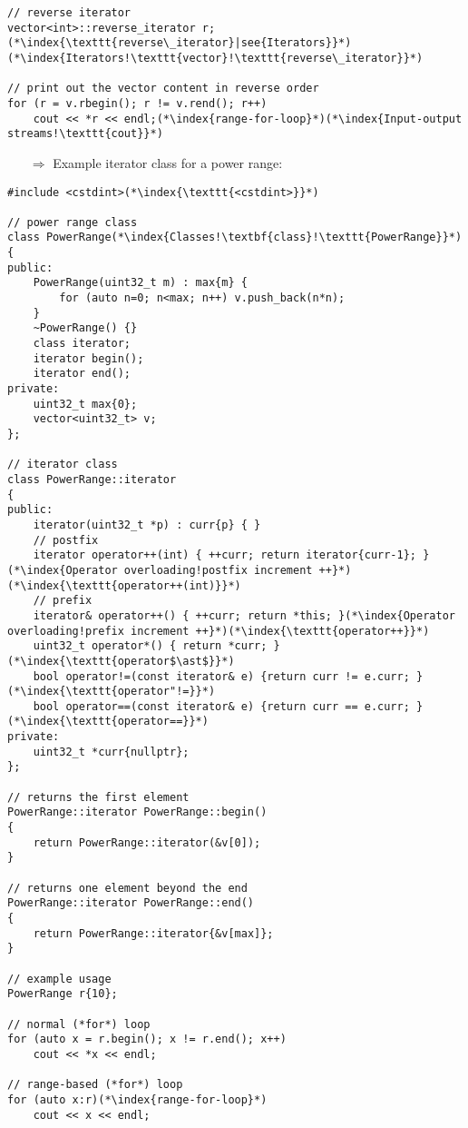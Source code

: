 \documentclass[10pt]{article}
\begin{document}
\begin{lstlisting}
// reverse iterator
vector<int>::reverse_iterator r;(*\index{\texttt{reverse\_iterator}|see{Iterators}}*)(*\index{Iterators!\texttt{vector}!\texttt{reverse\_iterator}}*)

// print out the vector content in reverse order
for (r = v.rbegin(); r != v.rend(); r++)
    cout << *r << endl;(*\index{range-for-loop}*)(*\index{Input-output streams!\texttt{cout}}*)
\end{lstlisting}
\begin{enumerate}
\item[$\Rightarrow$] Example iterator class for a power range:
\end{enumerate}
\begin{lstlisting}
#include <cstdint>(*\index{\texttt{<cstdint>}}*)

// power range class
class PowerRange(*\index{Classes!\textbf{class}!\texttt{PowerRange}}*)
{
public:
    PowerRange(uint32_t m) : max{m} {
        for (auto n=0; n<max; n++) v.push_back(n*n);
    }
    ~PowerRange() {}
    class iterator;
    iterator begin();
    iterator end();
private:
    uint32_t max{0};
    vector<uint32_t> v;
};

// iterator class
class PowerRange::iterator
{
public:
    iterator(uint32_t *p) : curr{p} { }
    // postfix
    iterator operator++(int) { ++curr; return iterator{curr-1}; }(*\index{Operator overloading!postfix increment ++}*)(*\index{\texttt{operator++(int)}}*)
    // prefix
    iterator& operator++() { ++curr; return *this; }(*\index{Operator overloading!prefix increment ++}*)(*\index{\texttt{operator++}}*)
    uint32_t operator*() { return *curr; }(*\index{\texttt{operator$\ast$}}*)
    bool operator!=(const iterator& e) {return curr != e.curr; }(*\index{\texttt{operator"!=}}*)
    bool operator==(const iterator& e) {return curr == e.curr; }(*\index{\texttt{operator==}}*)
private:
    uint32_t *curr{nullptr};
};

// returns the first element
PowerRange::iterator PowerRange::begin()
{
    return PowerRange::iterator(&v[0]);
}

// returns one element beyond the end
PowerRange::iterator PowerRange::end()
{
    return PowerRange::iterator{&v[max]};
}

// example usage
PowerRange r{10};
    
// normal (*for*) loop
for (auto x = r.begin(); x != r.end(); x++)
    cout << *x << endl;

// range-based (*for*) loop
for (auto x:r)(*\index{range-for-loop}*)
    cout << x << endl;
\end{lstlisting}
\end{document}
